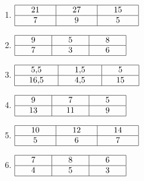 \documentclass[12 pt]{extarticle}
\theoremstyle{plain}
\begin{document}
\begin{enumerate}
	\item $\renewcommand{\arraystretch}{1}
\begin{array}{|c|c|c|}
\hline
\phantom{000}21\phantom{000} & \phantom{000}27\phantom{000} & \phantom{000}15\phantom{000}\\
\hline
7 & 9 & 5\\
\hline
\end{array}
\renewcommand{\arraystretch}{1}$

	\item $\renewcommand{\arraystretch}{1}
\begin{array}{|c|c|c|}
\hline
\phantom{000}9\phantom{000} & \phantom{000}5\phantom{000} & \phantom{000}8\phantom{000}\\
\hline
7 & 3 & 6\\
\hline
\end{array}
\renewcommand{\arraystretch}{1}$

	\item $\renewcommand{\arraystretch}{1}
\begin{array}{|c|c|c|}
\hline
\phantom{000}5{,}5\phantom{000} & \phantom{000}1{,}5\phantom{000} & \phantom{000}5\phantom{000}\\
\hline
16{,}5 & 4{,}5 & 15\\
\hline
\end{array}
\renewcommand{\arraystretch}{1}$

	\item $\renewcommand{\arraystretch}{1}
\begin{array}{|c|c|c|}
\hline
\phantom{000}9\phantom{000} & \phantom{000}7\phantom{000} & \phantom{000}5\phantom{000}\\
\hline
13 & 11 & 9\\
\hline
\end{array}
\renewcommand{\arraystretch}{1}$
	\item $\renewcommand{\arraystretch}{1}
\begin{array}{|c|c|c|}
\hline
\phantom{000}10\phantom{000} & \phantom{000}12\phantom{000} & \phantom{000}14\phantom{000}\\
\hline
5 & 6 & 7\\
\hline
\end{array}
\renewcommand{\arraystretch}{1}$

	\item $\renewcommand{\arraystretch}{1}
\begin{array}{|c|c|c|}
\hline
\phantom{000}7\phantom{000} & \phantom{000}8\phantom{000} & \phantom{000}6\phantom{000}\\
\hline
4 & 5 & 3\\
\hline
\end{array}
\renewcommand{\arraystretch}{1}$


\end{enumerate}
\end{document}

